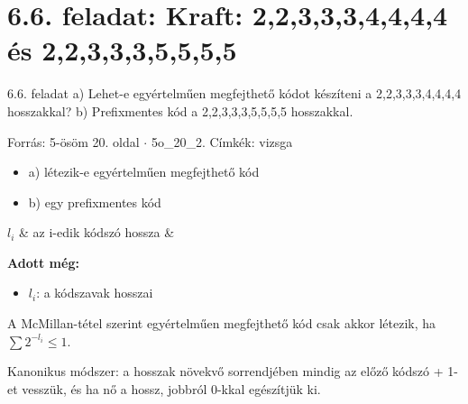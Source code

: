 \section{\texorpdfstring{6.6. feladat: Kraft: 2,2,3,3,3,4,4,4,4 és 2,2,3,3,3,5,5,5,5}{6.6. feladat: Kraft: 2,2,3,3,3,4,4,4,4 és 2,2,3,3,3,5,5,5,5}}\label{o6_06}
\setcounter{lepes}{0}
\begin{feladat}{6.6. feladat}
a) Lehet-e egyértelműen megfejthető kódot készíteni a 2,2,3,3,3,4,4,4,4 hosszakkal? b) Prefixmentes kód a 2,2,3,3,3,5,5,5,5 hosszakkal.

{\footnotesize\sffamily Forrás: 5-ösöm 20. oldal $\cdot$ 5o\_20\_2. Címkék: vizsga}
\end{feladat}
\begin{keresunk}
\begin{itemize}
\item a) létezik-e egyértelműen megfejthető kód
\item b) egy prefixmentes kód
\end{itemize}
\end{keresunk}
\begin{jeloles}
\begin{jeltabla}
$l_i$ & az i-edik kódszó hossza & \\
\end{jeltabla}
\par\smallskip\textbf{Adott még:}
\begin{itemize}
\item $l_i$: a kódszavak hosszai
\end{itemize}
\end{jeloles}

A McMillan-tétel szerint egyértelműen megfejthető kód csak akkor létezik, ha $\sum2^{-l_i}\le1$.

\begin{center}\end{center}



\begin{center}\end{center}

Kanonikus módszer: a hosszak növekvő sorrendjében mindig az előző kódszó + 1-et vesszük, és ha nő a hossz, jobbról 0-kkal egészítjük ki.

